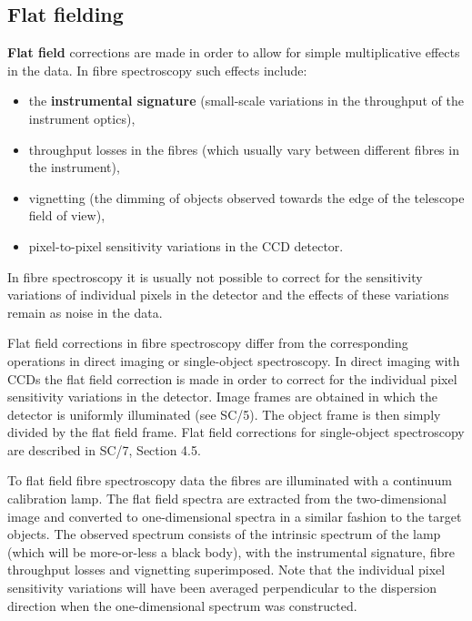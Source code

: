\documentclass[twoside,11pt]{article}
\newcommand{\xref}[3]{#1}
\begin{document}
\subsection{\label{FLAT}Flat fielding}

{\bf Flat field} corrections are made in order to allow for simple
multiplicative effects in the data.  In fibre spectroscopy such effects
include:

\begin{itemize}

  \item the {\bf instrumental signature} (small-scale variations in the
   throughput of the instrument optics),

  \item throughput losses in the fibres (which usually vary between
   different fibres in the instrument),

  \item vignetting (the dimming of objects observed towards the edge of
   the telescope field of view),

  \item pixel-to-pixel sensitivity variations in the CCD detector.

\end{itemize}

In fibre spectroscopy it is usually not possible to correct for the
sensitivity variations of individual pixels in the detector and the
effects of these variations remain as noise in the data.

Flat field corrections in fibre spectroscopy differ from the corresponding
operations in direct imaging or single-object spectroscopy.  In direct
imaging with CCDs the flat field correction is made in order to correct
for the individual pixel sensitivity variations in the detector.  Image
frames are obtained in which the detector is uniformly illuminated
(see \xref{SC/5}{sc5}{}).  The object frame is then simply divided by
the flat field frame.  Flat field corrections for single-object
spectroscopy are described in \xref{SC/7, Section 4.5}{sc7}{flat_fielding}.

To flat field fibre spectroscopy data the fibres are illuminated with a
continuum calibration lamp.  The flat field spectra are extracted from
the two-dimensional image and converted to one-dimensional spectra in a
similar fashion to the target objects.  The observed spectrum consists
of the intrinsic spectrum of the lamp (which will be more-or-less a
black body), with the instrumental signature, fibre throughput losses
and vignetting superimposed.  Note that the individual pixel sensitivity
variations will have been averaged perpendicular to the dispersion
direction when the one-dimensional spectrum was constructed.
\end{document}
